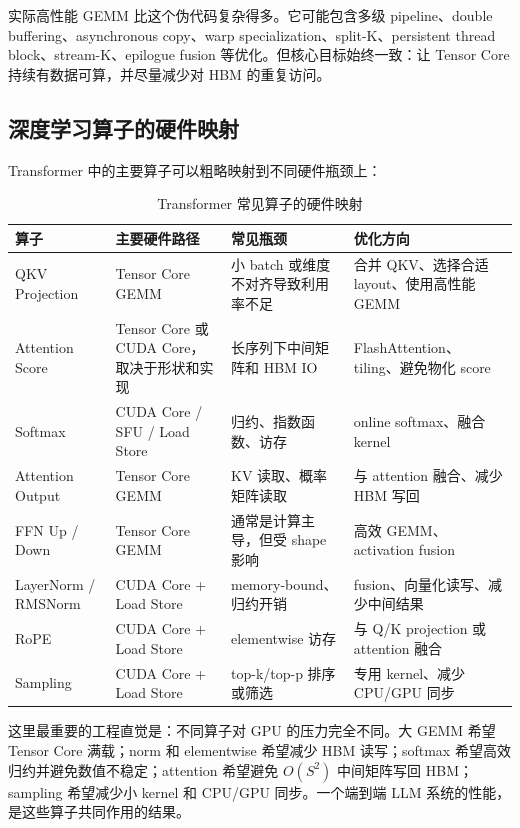 实际高性能 GEMM 比这个伪代码复杂得多。它可能包含多级 pipeline、double buffering、asynchronous copy、warp specialization、split-K、persistent thread block、stream-K、epilogue fusion 等优化。但核心目标始终一致：让 Tensor Core 持续有数据可算，并尽量减少对 HBM 的重复访问。

\subsection{深度学习算子的硬件映射}
\label{subsec:operator-hardware-mapping}

Transformer 中的主要算子可以粗略映射到不同硬件瓶颈上：

\begin{table}[H]
  \centering
  \caption{Transformer 常见算子的硬件映射}
  \label{tab:transformer-operator-hardware}
  \begin{tabular}{p{3.0cm}p{3.8cm}p{4.2cm}p{3.2cm}}
    \toprule
    算子 & 主要硬件路径 & 常见瓶颈 & 优化方向 \\
    \midrule
    QKV Projection & Tensor Core GEMM & 小 batch 或维度不对齐导致利用率不足 & 合并 QKV、选择合适 layout、使用高性能 GEMM \\
    Attention Score & Tensor Core 或 CUDA Core，取决于形状和实现 & 长序列下中间矩阵和 HBM IO & FlashAttention、tiling、避免物化 score \\
    Softmax & CUDA Core / SFU / Load Store & 归约、指数函数、访存 & online softmax、融合 kernel \\
    Attention Output & Tensor Core GEMM & KV 读取、概率矩阵读取 & 与 attention 融合、减少 HBM 写回 \\
    FFN Up / Down & Tensor Core GEMM & 通常是计算主导，但受 shape 影响 & 高效 GEMM、activation fusion \\
    LayerNorm / RMSNorm & CUDA Core + Load Store & memory-bound、归约开销 & fusion、向量化读写、减少中间结果 \\
    RoPE & CUDA Core + Load Store & elementwise 访存 & 与 Q/K projection 或 attention 融合 \\
    Sampling & CUDA Core + Load Store & top-k/top-p 排序或筛选 & 专用 kernel、减少 CPU/GPU 同步 \\
    \bottomrule
  \end{tabular}
\end{table}

这里最重要的工程直觉是：不同算子对 GPU 的压力完全不同。大 GEMM 希望 Tensor Core 满载；norm 和 elementwise 希望减少 HBM 读写；softmax 希望高效归约并避免数值不稳定；attention 希望避免 $O(S^2)$ 中间矩阵写回 HBM；sampling 希望减少小 kernel 和 CPU/GPU 同步。一个端到端 LLM 系统的性能，是这些算子共同作用的结果。

